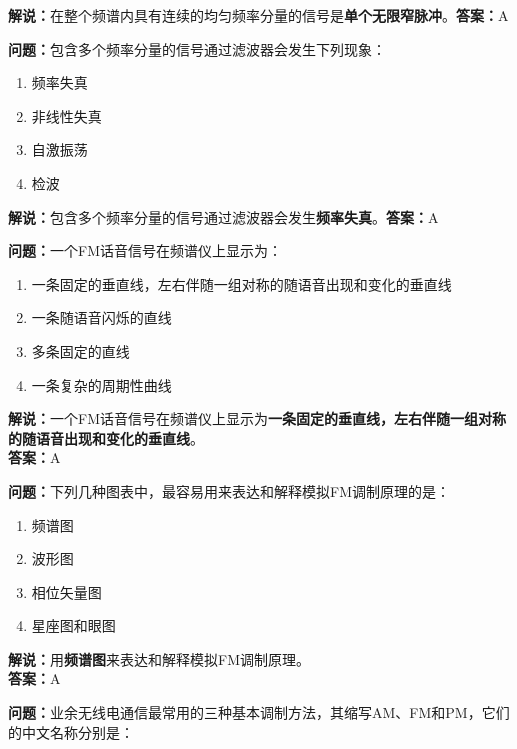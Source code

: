\textbf{解说：}在整个频谱内具有连续的均匀频率分量的信号是\textbf{单个无限窄脉冲}。\textbf{答案：}A%



\textbf{问题：}包含多个频率分量的信号通过滤波器会发生下列现象：

\begin{enumerate}[label=\Alph*), leftmargin=1cm]
	\item 频率失真
	\item 非线性失真
	\item 自激振荡
	\item 检波
\end{enumerate}

\textbf{解说：}包含多个频率分量的信号通过滤波器会发生\textbf{频率失真}。\textbf{答案：}A%



\textbf{问题：}一个FM话音信号在频谱仪上显示为：

\begin{enumerate}[label=\Alph*), leftmargin=1cm]
	\item 一条固定的垂直线，左右伴随一组对称的随语音出现和变化的垂直线
	\item 一条随语音闪烁的直线
	\item 多条固定的直线
	\item 一条复杂的周期性曲线
\end{enumerate}

\textbf{解说：}一个FM话音信号在频谱仪上显示为\textbf{一条固定的垂直线，左右伴随一组对称的随语音出现和变化的垂直线}。\\\textbf{答案：}A%



\textbf{问题：}下列几种图表中，最容易用来表达和解释模拟FM调制原理的是：

\begin{enumerate}[label=\Alph*), leftmargin=1cm]
	\item 频谱图
	\item 波形图
	\item 相位矢量图
	\item 星座图和眼图
\end{enumerate}

\textbf{解说：}用\textbf{频谱图}来表达和解释模拟FM调制原理。\\\textbf{答案：}A%



\textbf{问题：}业余无线电通信最常用的三种基本调制方法，其缩写AM、FM和PM，它们的中文名称分别是：

